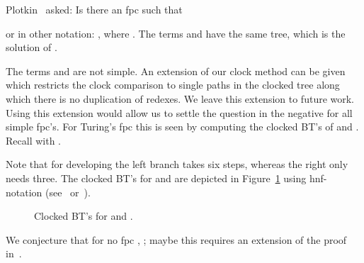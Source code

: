 Plotkin~\cite{plot:2007} asked:
Is there an fpc  such that

or in other notation: ,
where 
.
The terms  and  have the same \boehm{} tree,
which is the solution of .

The terms  and  are not simple.
An extension of our clock method can be given 
which restricts the clock comparison to single paths in the clocked \boehm{} tree
along which there is no duplication of redexes.
We leave this extension to future work.
Using this extension would allow us to settle 
the question in the negative for all simple fpc's.
For Turing's fpc  this is seen by computing 
the clocked BT's of  and .
Recall  with .

Note that for  developing the left branch takes six steps,
whereas the right only needs three.
The clocked BT's for  and  are depicted in Figure~\ref{fig:plotkin}
using hnf-notation (see~\cite{bare:1984} or~\cite{bare:klop:2009}).

\begin{figure}[ht!]
\begin{center}
  \quad
\caption{Clocked BT's for  and .}
\label{fig:plotkin}
\end{center}
\end{figure}

We conjecture that for no fpc , ;
maybe this requires an extension of the proof in~\cite{intri:1997}.


